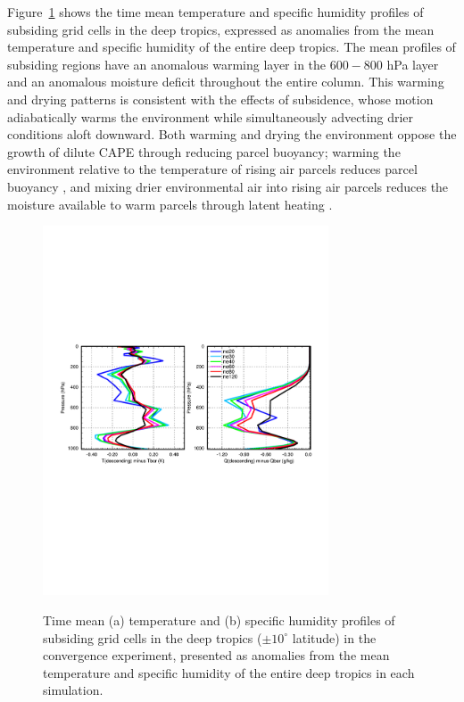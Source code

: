 \documentclass[times]{qjrms4}
\begin{document}
Figure~\ref{fig:profiles} shows the time mean temperature and specific humidity profiles of subsiding grid cells in the deep tropics, expressed as anomalies from the mean temperature and specific humidity of the entire deep tropics. The mean profiles of subsiding regions have an anomalous warming layer in the $600-800$ hPa layer and an anomalous moisture deficit throughout the entire column. This warming and drying patterns is consistent with the effects of subsidence, whose motion adiabatically warms the environment while simultaneously advecting drier conditions aloft downward. Both warming and drying the environment oppose the growth of dilute CAPE through reducing parcel buoyancy; warming the environment relative to the temperature of rising air parcels reduces parcel buoyancy \citep{Z2002JGR}, and mixing drier environmental air into rising air parcels reduces the moisture available to warm parcels through latent heating \citep{RB1992JAS}. 

\begin{figure}
\begin{center}
\noindent\includegraphics[width=20pc,angle=0]{figs/temp_profiles.pdf}\\
\end{center}
\caption{Time mean (a) temperature and (b) specific humidity profiles of subsiding grid cells in the deep tropics ($\pm 10^{\circ}$ latitude) in the convergence experiment, presented as anomalies from the mean temperature and specific humidity of the entire deep tropics in each simulation.}
\label{fig:profiles}
\end{figure}
\end{document}
